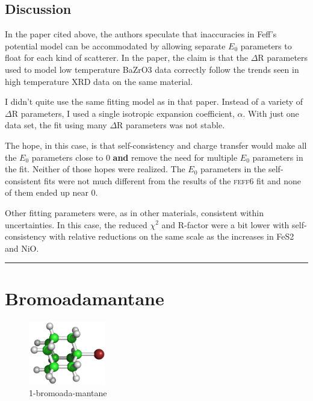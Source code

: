 \documentclass[11pt]{article}
\begin{document}
\subsection{Discussion}
\label{sec:orgheadline30}

In the paper cited above, the authors speculate that inaccuracies in
Feff's potential model can be accommodated by allowing separate $E_0$
parameters to float for each kind of scatterer. In the paper, the claim
is that the $\Delta$R parameters used to model low temperature BaZrO3 data
correctly follow the trends seen in high temperature XRD data on the
same material.

I didn't quite use the same fitting model as in that paper. Instead of a
variety of $\Delta$R parameters, I used a single isotropic expansion
coefficient, $\alpha$. With just one data set, the fit using many $\Delta$R parameters
was not stable.

The hope, in this case, is that self-consistency and charge transfer
would make all the $E_0$ parameters close to 0 \textbf{and} remove the need for
multiple $E_0$ parameters in the fit. Neither of those hopes were realized.
The $E_0$ parameters in the self-consistent fits were not much different
from the results of the \textsc{feff6} fit and none of them ended up near 0.

Other fitting parameters were, as in other materials, consistent within
uncertainties. In this case, the reduced $\chi^2$ and R-factor were a bit
lower with self-consistency with relative reductions on the same scale
as the increases in FeS2 and NiO.

\rule{\linewidth}{0.5pt}
\pagebreak

\section{Bromoadamantane}
\label{sec:orgheadline37}


\begin{figure}
  \begin{center}
    \includegraphics[width=0.3\textwidth]{bromoadamantane/bromoadamantane.png}
  \end{center}
  \caption{1-bromoada-mantane}
\end{figure}
\end{document}
